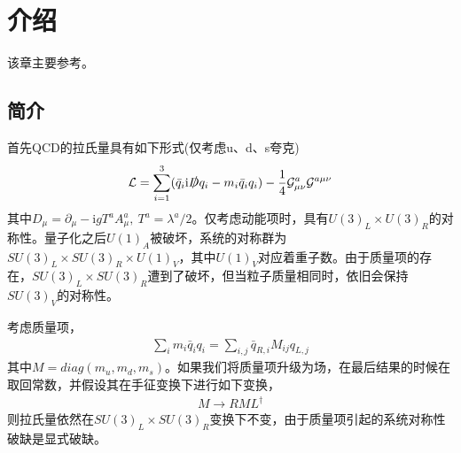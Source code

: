 \documentclass[aps,tightenlines,16pt]{ctexart}
\numberwithin{equation}{section}
\newcommand{\mO}{\mathcal{O}}
\newcommand{\mL}{\mathcal{L}}
\begin{document}





\section{介绍}
该章主要参考\cite{scherer2011primer}\cite{郑汉青2019量子场论上}。
\subsection{简介}
首先QCD的拉氏量具有如下形式(仅考虑u、d、s夸克)
\begin{align}
   \mL=\sum_{i=1}^{3}(\bar{q}_i \mbox{i} \slashed{D} q_i-m_i \bar{q}_i q_i)-\frac{1}{4}\mathcal{G}_{\mu \nu}^a \mathcal{G}^{a \mu \nu} 
\end{align}
其中$D_{\mu}=\partial_{\mu}-\mbox{i} g T^a A_{\mu}^a,\ T^a=\lambda^a/2$。仅考虑动能项时，具有$U(3)_L \times U(3)_R$的对称性。量子化之后$U(1)_A$被破坏，系统的对称群为$SU(3)_L \times SU(3)_R \times U(1)_V$，其中$U(1)_V$对应着重子数。由于质量项的存在，$SU(3)_L \times SU(3)_R$遭到了破坏，但当粒子质量相同时，依旧会保持$SU(3)_V$的对称性。

考虑质量项，
\begin{align}
   \sum_{i} m_i \bar{q}_i q_i = \sum_{i,j} \bar{q}_{R,i} M_{ij} q_{L,j}
\end{align}
其中$M=diag(m_u,m_d,m_s)$。如果我们将质量项升级为场，在最后结果的时候在取回常数，并假设其在手征变换下进行如下变换，
\begin{align}\label{rml}
   M \to RML^{\dagger}
\end{align}
则拉氏量依然在$SU(3)_L \times SU(3)_R$变换下不变，由于质量项引起的系统对称性破缺是显式破缺。
\end{document}
